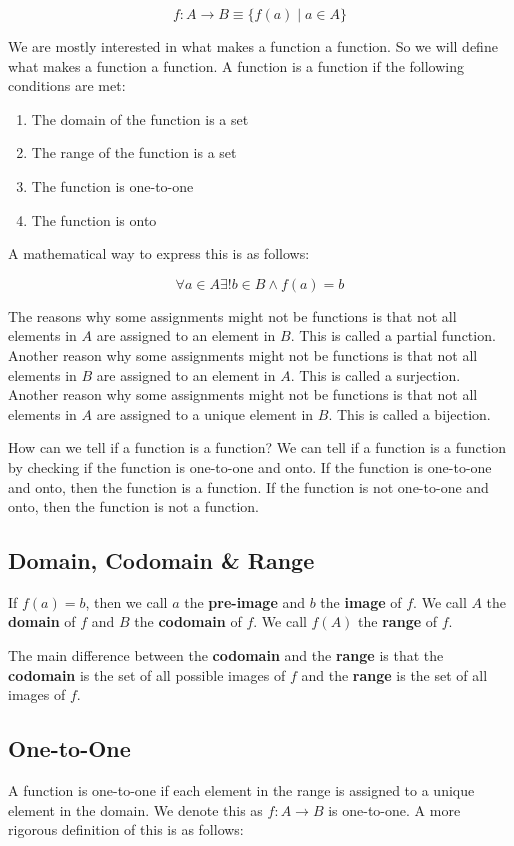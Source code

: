 \documentclass[11pt]{article}
\begin{document}
\[
f: A \rightarrow B \equiv \{f(a) \mid a \in A\}
\]

We are mostly interested in what makes a function a function. So we will define what makes a function a function. A function is a function if the following conditions are met:
\begin{enumerate}
\item The domain of the function is a set
\item The range of the function is a set
\item The function is one-to-one
\item The function is onto
\end{enumerate}

A mathematical way to express this is as follows:

\[
\forall a \in A \exists ! b \in B \land f(a) = b
\]

The reasons why some assignments might not be functions is that not all elements in \(A\) are assigned to an element in \(B\). This is called a partial function. Another reason why some assignments might not be functions is that not all elements in \(B\) are assigned to an element in \(A\). This is called a surjection. Another reason why some assignments might not be functions is that not all elements in \(A\) are assigned to a unique element in \(B\). This is called a bijection.

How can we tell if a function is a function? We can tell if a function is a function by checking if the function is one-to-one and onto. If the function is one-to-one and onto, then the function is a function. If the function is not one-to-one and onto, then the function is not a function.

\subsection{Domain, Codomain \& Range}
\label{sec:orgbef9d61}
If \(f(a) = b\), then we call \(a\) the \textbf{pre-image} and \(b\) the \textbf{image} of \(f\). We call \(A\) the \textbf{domain} of \(f\) and \(B\) the \textbf{codomain} of \(f\). We call \(f(A)\) the \textbf{range} of \(f\).

The main difference between the \textbf{codomain} and the \textbf{range} is that the \textbf{codomain} is the set of all possible images of \(f\) and the \textbf{range} is the set of all images of \(f\).


\subsection{One-to-One}
\label{sec:org8b43906}
A function is one-to-one if each element in the range is assigned to a unique element in the domain. We denote this as \(f: A \rightarrow B\) is one-to-one. A more rigorous definition of this is as follows:
\end{document}
